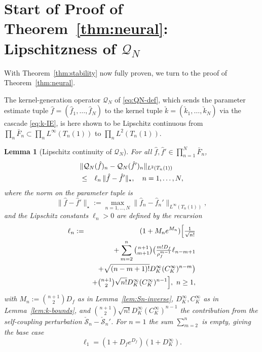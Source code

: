 \documentclass[journal,twoside,web]{ieeecolor}
\newtheorem{lemma}{Lemma}
\begin{document}
\section{Start of Proof of Theorem~\ref{thm:neural}: Lipschitzness of $\mathcal Q_N$}\label{sec:QN-Lip}

With Theorem~\ref{thm:stability} now fully proven, we turn to the proof of Theorem~\ref{thm:neural}.

The kernel-generation operator $\mathcal Q_N$ of \eqref{eq:QN-def}, which sends the parameter estimate tuple $\hat f=(\hat f_1,\ldots,\hat f_N)$ to the kernel tuple $\check k=(\check k_1,\ldots,\check k_N)$ via the cascade \eqref{eq:k-IE}, is here shown to be Lipschitz continuous from $\prod_n \bar F_n\subset\prod_n L^\infty(T_n(1))$ to $\prod_n L^2(T_n(1))$.

\begin{lemma}[Lipschitz continuity of $\mathcal Q_N$]\label{lem:Q-Lip}
For all $\hat f,\hat f'\in\prod_{n=1}^N \bar F_n$,
\begin{eqnarray}
\lefteqn{\|\mathcal Q_N(\hat f)_n-\mathcal Q_N(\hat f')_n\|_{L^2(T_n(1))}} \nonumber\\
&\le& \ell_n\,\|\hat f-\hat f'\|_\star,\quad n=1,\ldots,N, \label{eq:Q-Lip}
\end{eqnarray}
where the norm on the parameter tuple is
\begin{equation}\label{eq:star-norm}
\|\hat f-\hat f'\|_\star:=\max_{n=1,\ldots,N}\|\hat f_n-\hat f_n'\|_{L^\infty(T_n(1))},
\end{equation}
and the Lipschitz constants $\ell_n>0$ are defined by the recursion
\begin{eqnarray}
\ell_n &:=& (1+M_n e^{M_n})\Big[\tfrac{1}{\sqrt{n!}} \nonumber\\
&& +\sum_{m=2}^n\tbinom{n+1}{m+1}\big(\tfrac{m!D_f}{\rho_f^{m-1}}\ell_{n-m+1} \nonumber\\
&& \quad+\sqrt{(n-m+1)!}D_K^\infty(C_K^\infty)^{n-m}\big) \nonumber\\
&& +\tbinom{n+1}{2}\sqrt{n!}D_K^\infty(C_K^\infty)^{n-1}\Big],\ n\ge 1, \label{eq:lambda-recursion}
\end{eqnarray}
with $M_n:=\binom{n+1}{2}D_f$ as in Lemma~\ref{lem:Sn-inverse}, $D_K^\infty,C_K^\infty$ as in Lemma~\ref{lem:k-bounds}, and $\binom{n+1}{2}\sqrt{n!}D_K^\infty(C_K^\infty)^{n-1}$ the contribution from the self-coupling perturbation $\check{\mathcal S}_n-\check{\mathcal S}_n'$. For $n=1$ the sum $\sum_{m=2}^n$ is empty, giving the base case
\begin{equation}\label{eq:lambda-base}
\ell_1=(1+D_f e^{D_f})(1+D_K^\infty).
\end{equation}
\end{lemma}
\end{document}
